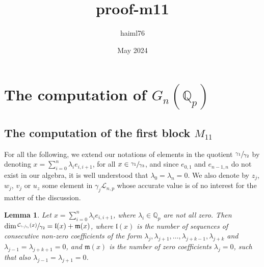 \documentclass[12pt]{article}
\title{proof-m11}
\author{haiml76 }
\date{May 2024}
\newtheorem{lemma}[theorem]{Lemma}
\begin{document}
\section{The computation of $G_n(\mathbb{Q}_p)$}
\subsection{The computation of the first block $M_{11}$}
For all the following, we extend our notations of elements in the quotient $\sfrac{\gamma_1}{\gamma_2}$ by denoting $x=\sum_{i=0}^n\lambda_i e_{i,i+1}$, for all $x\in\sfrac{\gamma_1}{\gamma_3}$, and since $e_{0,1}$ and $e_{n-1,n}$ do not exist in our algebra, it is well understood that $\lambda_0=\lambda_n=0$. We also denote by $z_j$, $w_j$, $v_j$ or $u_z$ some element in $\gamma_j\mathcal{L}_{n,p}$ whose accurate value is of no interest for the matter of the discussion.
\begin{lemma}
\label{prop.centralizer.dimension}
Let $x=\sum_{i=0}^n\lambda_i e_{i,i+1}$, where $\lambda_i\in\mathbb{Q}_p$ are not all zero. Then $\dim\sfrac{\mathcal{C}_{\sfrac{\gamma_1}{\gamma_3}}(x)}{\gamma_2}=\mathfrak{l}(x)+\mathfrak{m}(x)$, where $\mathfrak{l}(x)$ is the number of sequences of consecutive non-zero coefficients of the form $\lambda_j,\lambda_{j+1},\dots,\lambda_{j+k-1},\lambda_{j+k}$ and $\lambda_{j-1}=\lambda_{j+k+1}=0$, and $\mathfrak{m}(x)$ is the number of zero coefficients $\lambda_j=0$, such that also $\lambda_{j-1}=\lambda_{j+1}=0$.
\end{lemma}
\end{document}
